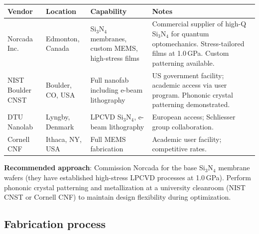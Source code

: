 \documentclass[11pt]{article}
\begin{document}
\begin{center}
\renewcommand{\arraystretch}{1.25}
\begin{tabular}{@{}p{3.5cm}p{2.5cm}p{3cm}p{4cm}@{}}
\toprule
\textbf{Vendor} & \textbf{Location} & \textbf{Capability} & \textbf{Notes} \\
\midrule
Norcada Inc. & Edmonton, Canada &
  Si$_3$N$_4$ membranes, custom MEMS, high-stress films &
  Commercial supplier of high-Q Si$_3$N$_4$ for quantum
  optomechanics. Stress-tailored films at 1.0\,GPa.
  Custom patterning available. \\
\midrule
NIST Boulder CNST & Boulder, CO, USA &
  Full nanofab including e-beam lithography &
  US government facility; academic access via user program.
  Phononic crystal patterning demonstrated. \\
\midrule
DTU Nanolab & Lyngby, Denmark &
  LPCVD Si$_3$N$_4$, e-beam lithography &
  European access; Schliesser group collaboration. \\
\midrule
Cornell CNF & Ithaca, NY, USA &
  Full MEMS fabrication &
  Academic user facility; competitive rates. \\
\bottomrule
\end{tabular}
\end{center}

\textbf{Recommended approach}: Commission Norcada for the base
Si$_3$N$_4$ membrane wafers (they have established high-stress LPCVD
processes at 1.0\,GPa). Perform phononic crystal patterning and
metallization at a university cleanroom (NIST CNST or Cornell CNF)
to maintain design flexibility during optimization.

\subsection{Fabrication process}
\end{document}
